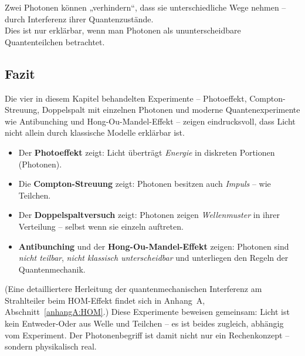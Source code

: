 \vspace{1em}
\begin{tcolorbox}[physikbox, title=Was der HOM-Effekt zeigt]
	\label{box:HOM-Effekt}
	\small
	Zwei Photonen können „verhindern“, dass sie unterschiedliche Wege nehmen – durch Interferenz ihrer Quantenzustände.\\
	Dies ist nur erklärbar, wenn man Photonen als ununterscheidbare Quantenteilchen betrachtet.
\end{tcolorbox}

\subsection{Fazit}

\begin{tcolorbox}[hinweisbox, title=Was die Experimente über Licht zeigen]
	\label{box:was die Experimente}
	\small
	Die vier in diesem Kapitel behandelten Experimente – Photoeffekt, Compton-Streuung, Doppelspalt mit einzelnen Photonen und moderne Quantenexperimente wie Antibunching und Hong-Ou-Mandel-Effekt – zeigen eindrucksvoll, dass Licht nicht allein durch klassische Modelle erklärbar ist.
	
	\begin{itemize}
		\item Der \textbf{Photoeffekt} zeigt: Licht überträgt \emph{Energie} in diskreten Portionen (Photonen).
		\item Die \textbf{Compton-Streuung} zeigt: Photonen besitzen auch \emph{Impuls} – wie Teilchen.
		\item Der \textbf{Doppelspaltversuch} zeigt: Photonen zeigen \emph{Wellenmuster} in ihrer Verteilung – selbst wenn sie einzeln auftreten.
		\item \textbf{Antibunching} und der \textbf{Hong-Ou-Mandel-Effekt} zeigen: Photonen sind \emph{nicht teilbar}, \emph{nicht klassisch unterscheidbar} und unterliegen den Regeln der Quantenmechanik.
	\end{itemize}
	(Eine detailliertere Herleitung der quantenmechanischen Interferenz am Strahlteiler beim HOM-Effekt findet sich in Anhang~A, Abschnitt~\ref{anhangA:HOM}.) %
	Diese Experimente beweisen gemeinsam: Licht ist kein Entweder-Oder aus Welle und Teilchen – es ist beides zugleich, abhängig vom Experiment. Der Photonenbegriff ist damit nicht nur ein Rechenkonzept – sondern physikalisch real.
\end{tcolorbox}
